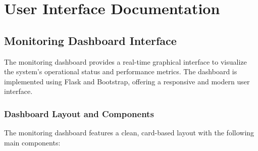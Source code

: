 \documentclass[12pt]{article}
\begin{document}
\section{User Interface Documentation}

\subsection{Monitoring Dashboard Interface}
The monitoring dashboard provides a real-time graphical interface to visualize the system's operational status and performance metrics. The dashboard is implemented using Flask and Bootstrap, offering a responsive and modern user interface.

\subsubsection{Dashboard Layout and Components}
The monitoring dashboard features a clean, card-based layout with the following main components:
\end{document}
